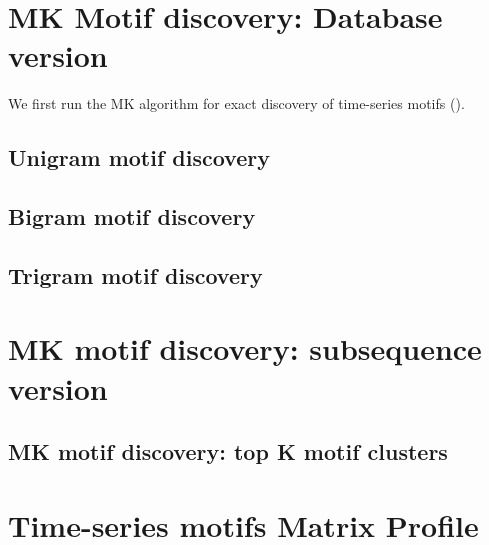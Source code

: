 \documentclass[11pt]{article}
\begin{document}
\section{MK Motif discovery: Database version}
We first run the MK algorithm for exact discovery of time-series motifs (\cite{Mueen2009}). 

\subsection{Unigram motif discovery}


\subsection {Bigram motif discovery}


\subsection {Trigram motif discovery}







\section{MK motif discovery: subsequence version}

\subsection{MK motif discovery: top K motif clusters}


\section{Time-series motifs Matrix Profile}










 

%
\end{document}
